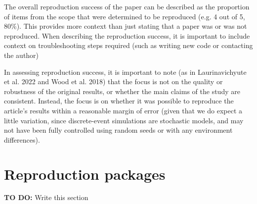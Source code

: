 The overall reproduction success of the paper can be described as the proportion of items from the scope that were determined to be reproduced (e.g. 4 out of 5, 80\%). This provides more context than just stating that a paper was or was not reproduced. When describing the reproduction success, it is important to include context on troubleshooting steps required (such as writing new code or contacting the author)

In assessing reproduction success, it is important to note (as in Laurinavichyute et al. 2022\autocite{laurinavichyute_share_2022} and Wood et al. 2018\autocite{wood_push_2018}) that the focus is not on the quality or robustness of the original results, or whether the main claims of the study are consistent. Instead, the focus is on whether it was possible to reproduce the article's results within a reasonable margin of error (given that we do expect a little variation, since discrete-event simulations are stochastic models, and may not have been fully controlled using random seeds or with any environment differences).

\section{Reproduction packages}


\textbf{TO DO:} Write this section
